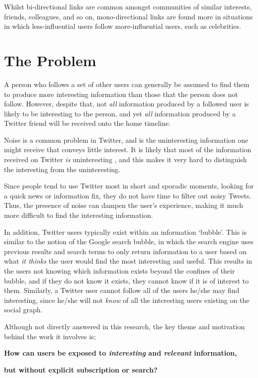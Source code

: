 Whilst bi-directional links are common amongst communities of similar interests, friends, colleagues, and so on, mono-directional links are found more in situations in which less-influential users follow more-influential users, such as celebrities.


\section{The Problem}
\label{section:research_questions}
A person who follows a set of other users can generally be assumed to find them to produce more interesting information than those that the person does not follow. However, despite that, not \textit{all} information produced by a followed user is likely to be interesting to the person, and yet \textit{all} information produced by a Twitter friend will be received onto the home timeline.

Noise is a common problem in Twitter, and is the uninteresting information one might receive that conveys little interest. It is likely that most of the information received on Twitter \textit{is} uninteresting \cite{alonso10}, and this makes it very hard to distinguish the interesting from the uninteresting.

Since people tend to use Twitter most in short and sporadic moments, looking for a quick news or information fix, they do not have time to filter out noisy Tweets. Thus, the presence of noise can dampen the user's experience, making it much more difficult to find the interesting information.

In addition, Twitter users typically exist within an information `bubble'. This is similar to the notion of the Google search bubble, in which the search engine uses previous results and search terms to only return information to a user based on what \textit{it thinks} the user would find the most interesting and useful. This results in the users not knowing which information exists beyond the confines of their bubble, and if they do not know it exists, they cannot know if it is of interest to them. Similarly, a Twitter user cannot follow all of the users he/she may find interesting, since he/she will not \textit{know} of all the interesting users existing on the social graph.

Although not directly answered in this research, the key theme and motivation behind the work it involves is;\\
\centerline{\textbf{How can users be exposed to \textit{interesting} and \textit{relevant} information,}}
\centerline{\textbf{but without explicit subscription or search?}}

